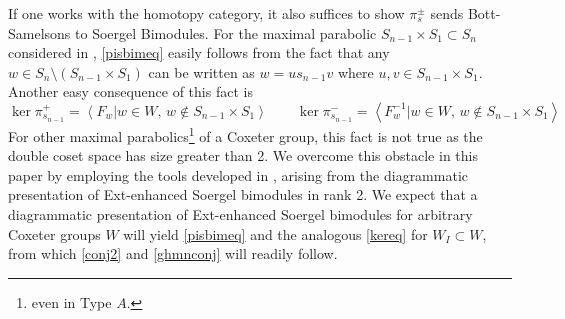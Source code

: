 \documentclass[10pt]{article}
\numberwithin{theorem}{section}
\theoremstyle{definition}
\newcommand{\abrac}[1]{\left\langle#1\right\rangle}
\newcommand{\0}{\ \raisebox{-2ex}{\begin{tikzpicture}[xscale=0.25,yscale=0.3,thick,baseline]
 \draw (0,0) -- (0,3); 
\end{tikzpicture}}}
\renewcommand{\1}{\ \raisebox{-2ex}{\begin{tikzpicture}[xscale=0.25,yscale=0.3,thick,baseline]
 \draw (0,0) -- (0,1);
 \draw (0,2) -- (0,3);
 \node[dot] at (0,1) {};
  \node[dot] at (0,2) {};
\end{tikzpicture}}}
\begin{document}
If one works with the homotopy category, it also suffices to show $\pi^{\pm}_s$ sends Bott-Samelsons to Soergel Bimodules. For the maximal parabolic $S_{n-1}\times S_1\subset S_n$ considered in \cite{GHMN19}, \cref{pisbimeq} easily follows from the fact that any $w\in S_n \setminus (S_{n-1}\times S_1)$ can be written as $w=us_{n-1} v$ where 
$u, v\in S_{n-1}\times S_1$. Another easy consequence of this fact is
\begin{equation}
\label{kereq}
    \ker \pi^+_{s_{n-1}}=\abrac{F_w| w\in W, \, w\not\in S_{n-1}\times S_1} \qquad  \ker \pi^-_{s_{n-1}}=\abrac{F_w^{-1} |w\in W, \, w\not\in S_{n-1}\times S_1}
\end{equation}
For other maximal parabolics\footnote{even in Type $A$.} of a Coxeter group, this fact is not true as the double coset space has size greater than 2. We overcome this obstacle in this paper by employing the tools developed in \cite{Li25}, arising from the diagrammatic presentation of Ext-enhanced Soergel bimodules in rank 2. We expect that a diagrammatic presentation of Ext-enhanced Soergel bimodules for arbitrary Coxeter groups $W$ will yield \cref{pisbimeq} and the analogous \cref{kereq} for $W_I\subset W$, from which \cref{conj2} and \cref{ghmnconj} will readily follow.   
\end{document}
